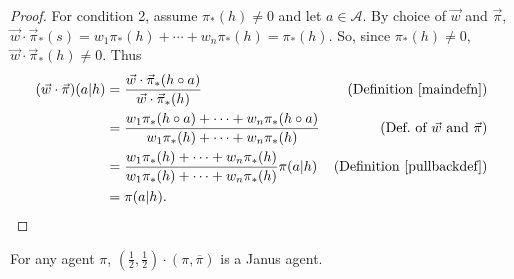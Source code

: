 \documentclass[runningheads]{llncs}
\begin{document}
\begin{proof}
        For condition 2,
        assume $\pi_*(h)\not=0$ and let $a\in\mathcal A$.
        By choice of $\vec w$ and $\vec\pi$,
        $\vec w\cdot\vec\pi_*(s)=w_1\pi_*(h)+\cdots+w_n\pi_*(h)=\pi_*(h)$.
        So, since $\pi_*(h)\not=0$, $\vec w\cdot\vec\pi_*(h)\not=0$.
        Thus
        \begin{align*}
            (\vec w\cdot\vec\pi)(a|h)
                &= \frac{\vec w\cdot \vec\pi_*(h\circ a)}{\vec w\cdot\vec\pi_*(h)}
                    &\mbox{(Definition \ref{maindefn})}\\
                &= \frac{w_1\pi_*(h\circ a)+\cdots+w_n\pi_*(h\circ a)}
                    {w_1\pi_*(h)+\cdots+w_n\pi_*(h)}
                    &\mbox{(Def.\ of $\vec w$ and $\vec\pi$)}\\
                &= \frac{w_1\pi_*(h)+\cdots+w_n\pi_*(h)}{w_1\pi_*(h)+\cdots+w_n\pi_*(h)}
                    \pi(a|h)
                    &\mbox{(Definition \ref{pullbackdef})}\\
                &= \pi(a|h).
        \end{align*}
\end{proof}

\begin{lemma}
\label{reflectionmakesjanuslemma}
    For any agent $\pi$,
    $(\frac12,\frac12)\cdot(\pi,\overline\pi)$ is a Janus agent.
\end{lemma}
\end{document}
